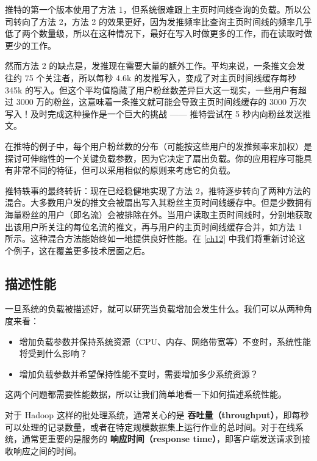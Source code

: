 推特的第一个版本使用了方法 1，但系统很难跟上主页时间线查询的负载。所以公司转向了方法 2，方法 2 的效果更好，因为发推频率比查询主页时间线的频率几乎低了两个数量级，所以在这种情况下，最好在写入时做更多的工作，而在读取时做更少的工作。

然而方法 2 的缺点是，发推现在需要大量的额外工作。平均来说，一条推文会发往约 75 个关注者，所以每秒 4.6k 的发推写入，变成了对主页时间线缓存每秒 345k 的写入。但这个平均值隐藏了用户粉丝数差异巨大这一现实，一些用户有超过 3000 万的粉丝，这意味着一条推文就可能会导致主页时间线缓存的 3000 万次写入！及时完成这种操作是一个巨大的挑战 —— 推特尝试在 5 秒内向粉丝发送推文。

在推特的例子中，每个用户粉丝数的分布（可能按这些用户的发推频率来加权）是探讨可伸缩性的一个关键负载参数，因为它决定了扇出负载。你的应用程序可能具有非常不同的特征，但可以采用相似的原则来考虑它的负载。

推特轶事的最终转折：现在已经稳健地实现了方法 2，推特逐步转向了两种方法的混合。大多数用户发的推文会被扇出写入其粉丝主页时间线缓存中。但是少数拥有海量粉丝的用户（即名流）会被排除在外。当用户读取主页时间线时，分别地获取出该用户所关注的每位名流的推文，再与用户的主页时间线缓存合并，如方法 1 所示。这种混合方法能始终如一地提供良好性能。在 \autoref{ch12} 中我们将重新讨论这个例子，这在覆盖更多技术层面之后。

\subsection{描述性能}

一旦系统的负载被描述好，就可以研究当负载增加会发生什么。我们可以从两种角度来看：

\begin{itemize}

  \item 增加负载参数并保持系统资源（CPU、内存、网络带宽等）不变时，系统性能将受到什么影响？

  \item 增加负载参数并希望保持性能不变时，需要增加多少系统资源？

\end{itemize}

这两个问题都需要性能数据，所以让我们简单地看一下如何描述系统性能。

对于 Hadoop 这样的批处理系统，通常关心的是 \textbf{吞吐量（throughput）}，即每秒可以处理的记录数量，或者在特定规模数据集上运行作业的总时间。对于在线系统，通常更重要的是服务的 \textbf{响应时间（response time）}，即客户端发送请求到接收响应之间的时间。

